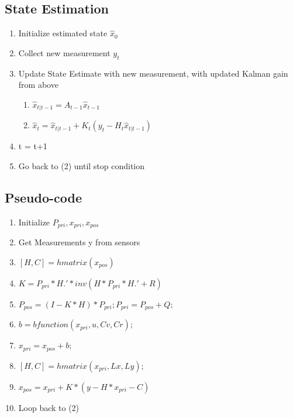 \documentclass[12pt, letterpaper]{amsart} %
\numberwithin{equation}{section}
\begin{document}
\subsection{State Estimation}
\begin{enumerate}
\item Initialize estimated state $\hat{x}_0$
\item Collect new measurement $y_t$
\item Update State Estimate with new measurement, with updated Kalman gain from above
  \begin{enumerate}
  \item $\hat{x}_{t|t-1} = A_{t-1} \hat{x}_{t-1}$ 
  \item $\hat{x}_t = \hat{x}_{t|t-1} + K_t(y_t - H_t \hat{x}_{t|t-1})$
  \end{enumerate}
\item t = t+1
\item Go back to (2) until stop condition  
\end{enumerate}

\subsection{Pseudo-code}
\begin{enumerate}
\item Initialize $P_{pri}, x_{pri}, x_{pos}$
\item Get Measurements y from sensors
\item $[H, C] = hmatrix(x_{pos})$
\item $K = P_{pri} * H.' * inv(H * P_{pri} * H.' + R)$
\item $P_{pos} = (I - K*H)*P_{pri}; P_{pri} = P_{pos} + Q;$
\item $b = bfunction(x_{pri}, u, Cv, Cr);$
\item $x_{pri} = x_{pos} + b;$
\item $[H, C] = hmatrix(x_{pri}, Lx, Ly);$
\item $x_{pos} = x_{pri} + K*(y - H*x_{pri} - C)$
\item Loop back to (2)
\end{enumerate}
\newpage
\end{document}
